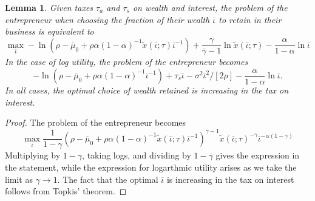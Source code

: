 \documentclass[11pt]{article}
\theoremstyle{plain}
\newtheorem{lemma}[thm]{Lemma}
\begin{document}

\begin{lemma} \label{arb_eq}
Given taxes $\tau_a$ and $\tau_s$ on wealth and interest, the problem of the entrepreneur when choosing the fraction of their wealth $\overline{\iota}$ to retain in their business is equivalent to 
\begin{equation}
\max_{\overline{\iota}} - \ln {\left(\rho - \overline{\mu}_0 + \rho\alpha (1-\alpha)^{-1}\tilde{x}(\overline{\iota};\tau)\overline{\iota}^{-1}\right)}
+\frac{\gamma}{\overline{\gamma}-1}\ln \tilde{x}(\overline{\iota};\tau) - \frac{\alpha}{1-\alpha} \ln \overline{\iota}
\label{initial_prob}
\end{equation}
In the case of log utility, the problem of the entrepreneur becomes
\begin{equation}
-\ln {\left(\rho - \overline{\mu}_0 + \rho\alpha (1-\alpha)^{-1}\overline{\iota}^{-1}\right)} + \tau_s\overline{\iota} - \sigma^2\overline{\iota}^2/[2\rho] - \frac{\alpha}{1-\alpha}\ln \overline{\iota}.
\label{initial_prob3}
\end{equation}
In all cases, the optimal choice of wealth retained is increasing in the tax on interest. 
\end{lemma}

\begin{proof}
The problem of the entrepreneur becomes 
\begin{equation}
\max_{\overline{\iota}} \frac{1}{1-\gamma}{\left(\rho - \overline{\mu}_0 + \rho\alpha (1-\alpha)^{-1}\tilde{x}(\overline{\iota};\tau)\overline{\iota}^{-1}\right)}^{\overline{\gamma}-1}\tilde{x}(\overline{\iota};\tau)^{-\gamma}\overline{\iota}^{-\alpha(1-\gamma)}
\label{initial_prob0}
\end{equation}
Multiplying by $1 - \gamma$, taking logs, and dividing by $1-\overline{\gamma}$ gives the expression in the statement, while the expression for logarthmic utility arises as we take the limit as $\gamma \rightarrow 1$. The fact that the optimal $\overline{\iota}$ is increasing in the tax on interest follows from Topkis' theorem. 
\end{proof} %

\end{document}
